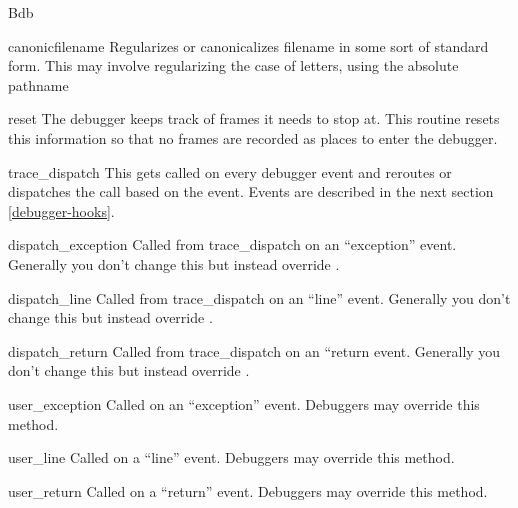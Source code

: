 \begin{classdesc}{Bdb}{}\label{Bdb}

\begin{methoddesc}{canonic}{filename}
  Regularizes or canonicalizes filename in some sort of standard
  form. This may involve regularizing the case of letters, using
  the absolute pathname
\end{methoddesc}

\begin{methoddesc}{reset}{}
  The debugger keeps track of frames it needs to stop at. This routine
  resets this information so that no frames are recorded as places to
  enter the debugger.
\end{methoddesc}

\begin{methoddesc}{trace_dispatch}{}
  This gets called on every debugger event and reroutes or dispatches
  the call based on the event. Events are described in the next
  section \ref{debugger-hooks}.  
\end{methoddesc}

\begin{methoddesc}{dispatch_exception}{}
  Called from trace_dispatch on an ``exception'' event. Generally you
  don't change this but instead override .
\end{methoddesc}

\begin{methoddesc}{dispatch_line}{}
  Called from trace_dispatch on an ``line'' event. Generally you
  don't change this but instead override .
\end{methoddesc}

\begin{methoddesc}{dispatch_return}{}
  Called from trace_dispatch on an ``return event. Generally you
  don't change this but instead override .
\end{methoddesc}

\begin{methoddesc}{user_exception}{}
  Called on an ``exception'' event. Debuggers may override this method.
\end{methoddesc}

\begin{methoddesc}{user_line}{}
  Called on a ``line'' event. Debuggers may override this method.
\end{methoddesc}

\begin{methoddesc}{user_return}{}
  Called on a ``return'' event. Debuggers may override this method.
\end{methoddesc}

\end{classdesc}

